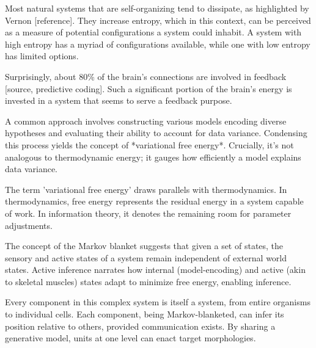 Most natural systems that are self-organizing tend to dissipate, as highlighted by Vernon [reference]. They increase entropy, which in this context, can be perceived as a measure of potential configurations a system could inhabit. A system with high entropy has a myriad of configurations available, while one with low entropy has limited options.

Surprisingly, about 80\% of the brain's connections are involved in feedback [source, predictive coding]. Such a significant portion of the brain's energy is invested in a system that seems to serve a feedback purpose. 



A common approach involves constructing various models encoding diverse hypotheses and evaluating their ability to account for data variance. Condensing this process yields the concept of *variational free energy*. Crucially, it's not analogous to thermodynamic energy; it gauges how efficiently a model explains data variance.

The term 'variational free energy' draws parallels with thermodynamics. In thermodynamics, free energy represents the residual energy in a system capable of work. In information theory, it denotes the remaining room for parameter adjustments.

The concept of the Markov blanket suggests that given a set of states, the sensory and active states of a system remain independent of external world states. Active inference narrates how internal (model-encoding) and active (akin to skeletal muscles) states adapt to minimize free energy, enabling inference.

Every component in this complex system is itself a system, from entire organisms to individual cells. Each component, being Markov-blanketed, can infer its position relative to others, provided communication exists. By sharing a generative model, units at one level can enact target morphologies.






